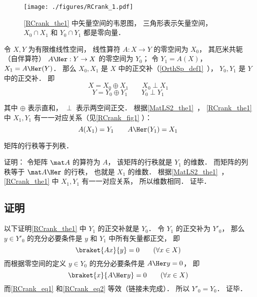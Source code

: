 

\begin{figure}[ht]
\centering
\texttt{[image: ./figures/RCrank\_1.pdf]}
\caption{\autoref{RCrank_the1} 中矢量空间的韦恩图， 三角形表示矢量空间， $X_0\cap X_1$ 和 $Y_0\cap  Y_1$ 都是零向量．} \label{RCrank_fig1}
\end{figure}

\begin{theorem}{}\label{RCrank_the1}
令 $X, Y$ 为有限维线性空间， 线性算符 $A:X \to Y$ 的零空间为 $X_0$， 其厄米共轭（自伴算符） $A\Her: Y \to X$ 的零空间为 $Y_0$； 令 $Y_1 = A(X)$， $X_1 = A\Her(Y)$． 那么 $X_0, X_1$ 是 $X$ 中的正交补（\autoref{OrthSp_def1}~）， $Y_0, Y_1$ 是 $Y$ 中的正交补． 即
\begin{equation}
X = X_0 \oplus X_1 \qquad X_0 \perp X_1
\end{equation}
\begin{equation}
Y = Y_0 \oplus Y_1 \qquad Y_0 \perp Y_1
\end{equation}
\end{theorem}
其中 $\oplus$ 表示直和， $\perp$ 表示两空间正交． 根据\autoref{MatLS2_the1}~， \autoref{RCrank_the1} 中 $X_1, Y_1$ 有一一对应关系（见\autoref{RCrank_fig1} ）：
\begin{equation}
A(X_1) = Y_1 \qquad A\Her (Y_1) = X_1
\end{equation}

\begin{corollary}{}
矩阵的行秩等于列秩．
\end{corollary}
证明： 令矩阵 $\mat A$ 的算符为 $A$， 该矩阵的行秩就是 $Y_1$ 的维数． 而矩阵的列秩等于 $\mat A\Her$ 的行秩， 也就是 $X_1$ 的维数． 根据\autoref{MatLS2_the1}~， \autoref{RCrank_the1} 中 $X_1, Y_1$ 有一一对应关系， 所以维数相同． 证毕．

\subsection{证明}
以下证明\autoref{RCrank_the1} 中 $Y_1$ 的正交补就是 $Y_0$． 令 $Y_1$ 的正交补为 $Y'_0$， 那么 $y \in Y'_0$ 的充分必要条件是 $y$ 和 $Y_1$ 中所有矢量都正交， 即
\begin{equation}\label{RCrank_eq1}
\braket{Ax}{y} = 0 \qquad (\forall x \in X)
\end{equation}
而根据零空间的定义 $y \in Y_0$ 的充分必要条件是 $A\Her y = 0$， 即
\begin{equation}\label{RCrank_eq2}
\braket{x}{A\Her y} = 0 \qquad (\forall x \in X)
\end{equation}
而\autoref{RCrank_eq1} 和\autoref{RCrank_eq2} 等效（链接未完成）． 所以 $Y'_0 = Y_0$． 证毕．
